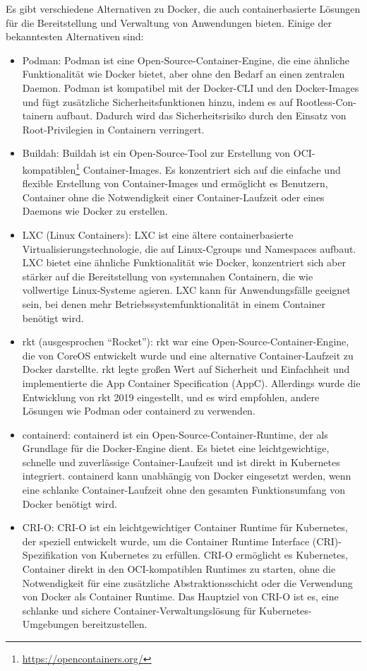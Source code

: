 \documentclass[../vs-script-first-v01.tex]{subfiles}
\begin{document}
Es gibt verschiedene Alternativen zu Docker, die auch containerbasierte Lösungen für die Bereitstellung und Verwaltung von Anwendungen bieten. Einige der bekanntesten Alternativen sind:
\begin{itemize}
\item Podman: Podman ist eine Open-Source-Container-Engine, die eine ähnliche Funktionalität wie Docker bietet, aber ohne den Bedarf an einen zentralen Daemon. Podman ist kompatibel mit der Docker-CLI und den Docker-Images und fügt zusätzliche Sicherheitsfunktionen hinzu, indem es auf Rootless-Con-tainern aufbaut. Dadurch wird das Sicherheitsrisiko durch den Einsatz von Root-Privilegien in Containern verringert.
\item Buildah: Buildah ist ein Open-Source-Tool zur Erstellung von OCI-kompatiblen\footnote{\url{https://opencontainers.org/}} Container-Images. Es konzentriert sich auf die einfache und flexible Erstellung von Container-Images und ermöglicht es Benutzern, Container ohne die Notwendigkeit einer Container-Laufzeit oder eines Daemons wie Docker zu erstellen.
\item LXC (Linux Containers): LXC ist eine ältere containerbasierte Virtualisierungstechnologie, die auf Linux-Cgroups und Namespaces aufbaut. LXC bietet eine ähnliche Funktionalität wie Docker, konzentriert sich aber stärker auf die Bereitstellung von systemnahen Containern, die wie vollwertige Linux-Systeme agieren. LXC kann für Anwendungsfälle geeignet sein, bei denen mehr Betriebssystemfunktionalität in einem Container benötigt wird.
\item rkt (ausgesprochen \enquote{Rocket}): rkt war eine Open-Source-Container-Engine, die von CoreOS entwickelt wurde und eine alternative Container-Laufzeit zu Docker darstellte. rkt legte großen Wert auf Sicherheit und Einfachheit und implementierte die App Container Specification (AppC). Allerdings wurde die Entwicklung von rkt 2019 eingestellt, und es wird empfohlen, andere Lösungen wie Podman oder containerd zu verwenden.
\item containerd: containerd ist ein Open-Source-Container-Runtime, der als Grundlage für die Docker-Engine dient. Es bietet eine leichtgewichtige, schnelle und zuverlässige Container-Laufzeit und ist direkt in Kubernetes integriert. containerd kann unabhängig von Docker eingesetzt werden, wenn eine schlanke Container-Laufzeit ohne den gesamten Funktionsumfang von Docker benötigt wird.
\item CRI-O: CRI-O ist ein leichtgewichtiger Container Runtime für Kubernetes, der speziell entwickelt wurde, um die Container Runtime Interface (CRI)-Spezifikation von Kubernetes zu erfüllen. CRI-O ermöglicht es Kubernetes, Container direkt in den OCI-kompatiblen Runtimes zu starten, ohne die Notwendigkeit für eine zusätzliche Abstraktionsschicht oder die Verwendung von Docker als Container Runtime. Das Hauptziel von CRI-O ist es, eine schlanke und sichere Container-Verwaltungslösung für Kubernetes-Umgebungen bereitzustellen.
\end{itemize}  
\end{document}
